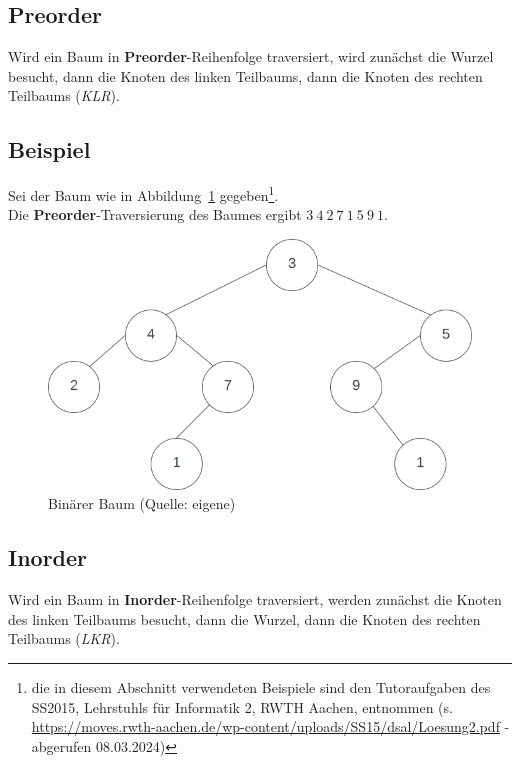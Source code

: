 \subsection{Preorder}
Wird ein Baum in \textbf{Preorder}-Reihenfolge traversiert, wird zunächst die Wurzel besucht, dann die Knoten des linken Teilbaums, dann die Knoten des rechten Teilbaums (\textit{KLR}).


\subsection*{Beispiel}
Sei der Baum wie in Abbildung~\ref{fig:bintree} gegeben\footnote{
die in diesem Abschnitt verwendeten Beispiele sind den Tutoraufgaben des SS2015, Lehrstuhls für Informatik 2, RWTH Aachen, entnommen (s. \url{https://moves.rwth-aachen.de/wp-content/uploads/SS15/dsal/Loesung2.pdf} - abgerufen 08.03.2024)
}.\\

\noindent
Die \textbf{Preorder}-Traversierung des Baumes ergibt  $3\ 4\ 2\ 7\ 1\ 5\ 9\ 1$.

\begin{figure}
    \begin{center}
        \includegraphics[scale=0.4]{chapters/Datenstrukturen und Algorithmen/img/bintree}
        \caption{Binärer Baum (Quelle: eigene)}
        \label{fig:bintree}
    \end{center}
\end{figure}

\subsection{Inorder}
Wird ein Baum in \textbf{Inorder}-Reihenfolge traversiert, werden zunächst die Knoten des linken Teilbaums besucht, dann die Wurzel, dann die Knoten des rechten Teilbaums (\textit{LKR}).

